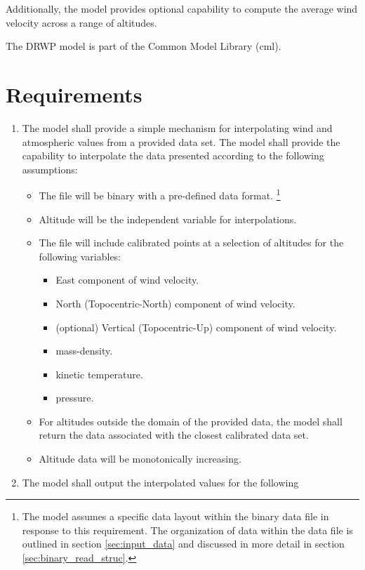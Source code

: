 \documentclass[11pt,fleqn]{report}
\begin{document}
Additionally, the model provides optional capability to compute the average
wind velocity across a range of altitudes.

The DRWP model is part of the Common Model Library (cml).

\chapter{Requirements}
\begin{enumerate}
\item The model shall provide a simple mechanism for interpolating wind
  and atmospheric values from a provided data set. The model shall provide
  the capability to interpolate the data presented according to the
  following assumptions:
   \begin{itemize}
  \item The file will be binary with a pre-defined data format.
    \footnote{The model assumes a specific data layout within the binary
              data file in response to this requirement. The organization
              of data within the data file
              is outlined in section \ref{sec:input_data}
              and discussed in more detail in section
              \ref{sec:binary_read_struc}.}
  \item Altitude will be the independent variable for interpolations.
  \item The file will include calibrated points at a selection of altitudes
    for the following variables:
    \begin{itemize}
    \item East component of wind velocity.
    \item North (Topocentric-North) component of wind velocity.
    \item (optional) Vertical (Topocentric-Up) component of wind velocity.
    \item mass-density.
    \item kinetic temperature.
    \item pressure.
    \end{itemize}
  \item For altitudes outside the domain of the provided data, the model
    shall return the data associated with the closest calibrated data set.
  \item Altitude data will be monotonically increasing.
   \end{itemize}
\item The model shall output the interpolated values for the following

\end{enumerate}
\end{document}
